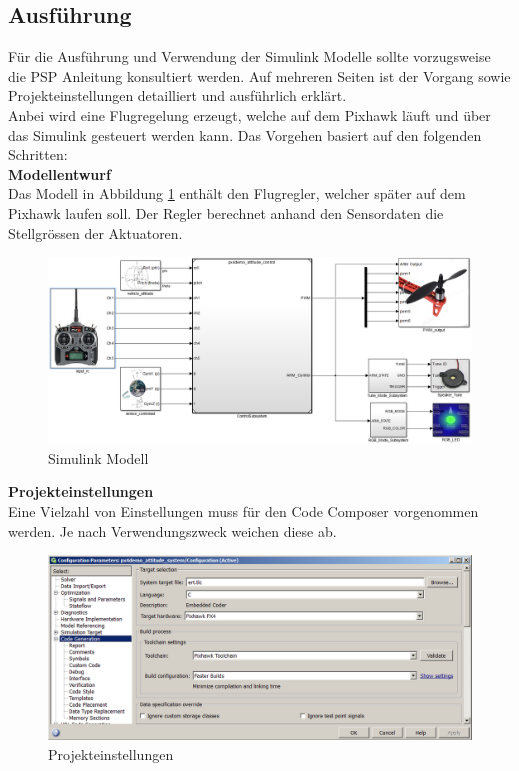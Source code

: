 \subsection{Ausführung}
Für die Ausführung und Verwendung der Simulink Modelle sollte vorzugsweise die PSP Anleitung konsultiert werden. Auf mehreren Seiten ist der Vorgang sowie Projekteinstellungen detailliert und ausführlich erklärt.\\
Anbei wird eine Flugregelung erzeugt, welche auf dem Pixhawk läuft und über das Simulink gesteuert werden kann. Das Vorgehen basiert auf den folgenden Schritten:\\

\noindent
\textbf{Modellentwurf}\\
Das Modell in Abbildung \ref{fig:psp_modell} enthält den Flugregler, welcher später auf dem Pixhawk laufen soll. Der Regler berechnet anhand den Sensordaten die Stellgrössen der Aktuatoren.
\begin{figure}[H]
  \begin{center}
  \includegraphics[scale=0.3]{pic/40_psp/psp_model.png}
  \caption{Simulink Modell}
  \label{fig:psp_modell}
  \end{center}
\end{figure}

\noindent
\textbf{Projekteinstellungen}\\
Eine Vielzahl von Einstellungen muss für den Code Composer vorgenommen werden. Je nach Verwendungszweck weichen diese ab.

\begin{figure}[H]
  \begin{center}
  \includegraphics[scale=0.3]{pic/40_psp/psp_settings.png}
  \caption{Projekteinstellungen}
  \label{fig:psp_config}
  \end{center}
\end{figure}

